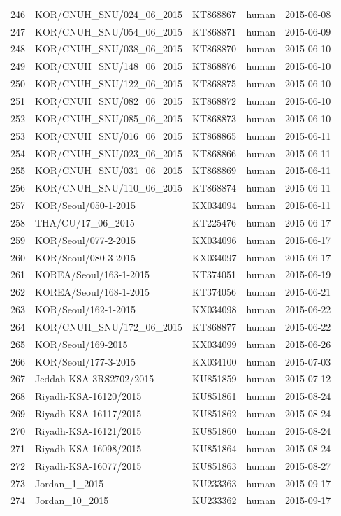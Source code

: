 \documentclass[11pt,oneside,letterpaper]{article}
\begin{document}
\begin{longtable}{ | l | l | l | l | l | }
  246 & KOR/CNUH\_SNU/024\_06\_2015 & KT868867 & human & 2015-06-08 \\
  247 & KOR/CNUH\_SNU/054\_06\_2015 & KT868871 & human & 2015-06-09 \\
  248 & KOR/CNUH\_SNU/038\_06\_2015 & KT868870 & human & 2015-06-10 \\
  249 & KOR/CNUH\_SNU/148\_06\_2015 & KT868876 & human & 2015-06-10 \\
  250 & KOR/CNUH\_SNU/122\_06\_2015 & KT868875 & human & 2015-06-10 \\
  251 & KOR/CNUH\_SNU/082\_06\_2015 & KT868872 & human & 2015-06-10 \\
  252 & KOR/CNUH\_SNU/085\_06\_2015 & KT868873 & human & 2015-06-10 \\
  253 & KOR/CNUH\_SNU/016\_06\_2015 & KT868865 & human & 2015-06-11 \\
  254 & KOR/CNUH\_SNU/023\_06\_2015 & KT868866 & human & 2015-06-11 \\
  255 & KOR/CNUH\_SNU/031\_06\_2015 & KT868869 & human & 2015-06-11 \\
  256 & KOR/CNUH\_SNU/110\_06\_2015 & KT868874 & human & 2015-06-11 \\
  257 & KOR/Seoul/050-1-2015 & KX034094 & human & 2015-06-11 \\
  258 & THA/CU/17\_06\_2015 & KT225476 & human & 2015-06-17 \\
  259 & KOR/Seoul/077-2-2015 & KX034096 & human & 2015-06-17 \\
  260 & KOR/Seoul/080-3-2015 & KX034097 & human & 2015-06-17 \\
  261 & KOREA/Seoul/163-1-2015 & KT374051 & human & 2015-06-19 \\
  262 & KOREA/Seoul/168-1-2015 & KT374056 & human & 2015-06-21 \\
  263 & KOR/Seoul/162-1-2015 & KX034098 & human & 2015-06-22 \\
  264 & KOR/CNUH\_SNU/172\_06\_2015 & KT868877 & human & 2015-06-22 \\
  265 & KOR/Seoul/169-2015 & KX034099 & human & 2015-06-26 \\
  266 & KOR/Seoul/177-3-2015 & KX034100 & human & 2015-07-03 \\
  267 & Jeddah-KSA-3RS2702/2015 & KU851859 & human & 2015-07-12 \\
  268 & Riyadh-KSA-16120/2015 & KU851861 & human & 2015-08-24 \\
  269 & Riyadh-KSA-16117/2015 & KU851862 & human & 2015-08-24 \\
  270 & Riyadh-KSA-16121/2015 & KU851860 & human & 2015-08-24 \\
  271 & Riyadh-KSA-16098/2015 & KU851864 & human & 2015-08-24 \\
  272 & Riyadh-KSA-16077/2015 & KU851863 & human & 2015-08-27 \\
  273 & Jordan\_1\_2015 & KU233363 & human & 2015-09-17 \\
  274 & Jordan\_10\_2015 & KU233362 & human & 2015-09-17 \\
\end{longtable}
\end{document}
